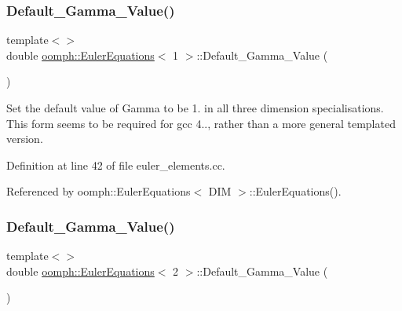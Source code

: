 \mbox{\label{classoomph_1_1EulerEquations_ac04a109a379577a830dc3700cbe8d311}} 
\subsubsection{\texorpdfstring{Default\+\_\+\+Gamma\+\_\+\+Value()}{Default\_Gamma\_Value()}\hspace{0.1cm}{\footnotesize\ttfamily [1/3]}}
{\footnotesize\ttfamily template$<$$>$ \\
double \hyperlink{classoomph_1_1EulerEquations}{oomph\+::\+Euler\+Equations}$<$ 1 $>$\+::Default\+\_\+\+Gamma\+\_\+\+Value (\begin{DoxyParamCaption}{ }\end{DoxyParamCaption})\hspace{0.3cm}{\ttfamily [private]}}

Set the default value of Gamma to be 1. in all three dimension specialisations. This form seems to be required for gcc 4.., rather than a more general templated version. 

Definition at line 42 of file euler\+\_\+elements.\+cc.



Referenced by oomph\+::\+Euler\+Equations$<$ D\+I\+M $>$\+::\+Euler\+Equations().

\mbox{\label{classoomph_1_1EulerEquations_a4cf291148209c3de66aab3cc2f332d2c}} 
\subsubsection{\texorpdfstring{Default\+\_\+\+Gamma\+\_\+\+Value()}{Default\_Gamma\_Value()}\hspace{0.1cm}{\footnotesize\ttfamily [2/3]}}
{\footnotesize\ttfamily template$<$$>$ \\
double \hyperlink{classoomph_1_1EulerEquations}{oomph\+::\+Euler\+Equations}$<$ 2 $>$\+::Default\+\_\+\+Gamma\+\_\+\+Value (\begin{DoxyParamCaption}{ }\end{DoxyParamCaption})\hspace{0.3cm}{\ttfamily [private]}}



